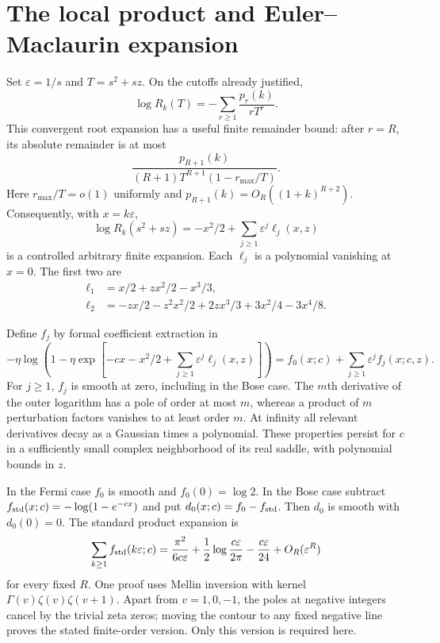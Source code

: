 \documentclass[11pt]{article}
\theoremstyle{remark}\newtheorem{remark}[theorem]{Remark}
\newcommand{\eps}{\varepsilon}
\begin{document}
\section{The local product and Euler--Maclaurin expansion}\label{aop:sec:EM}

Set $\eps=1/s$ and $T=s^2+sz$. On the cutoffs already justified,
\begin{equation}\label{aop:eq:rootseries}
 \log R_k(T)=-\sum_{r\ge1}\frac{p_r(k)}{rT^r}.
\end{equation}
This convergent root expansion has a useful finite remainder bound:
after $r=R$, its absolute remainder is at most
\begin{equation}\label{aop:eq:rooterror}
 \frac{p_{R+1}(k)}{(R+1)T^{R+1}(1-r_{\max}/T)}.
\end{equation}
Here $r_{\max}/T=o(1)$ uniformly and
$p_{R+1}(k)=O_R((1+k)^{R+2})$. Consequently, with $x=k\eps$,
\[
 \log R_k(s^2+sz)=-x^2/2+\sum_{j\ge1}\eps^j\ell_j(x,z)
\]
is a controlled arbitrary finite expansion. Each $\ell_j$ is a
polynomial vanishing at $x=0$. The first two are
\begin{align}
 \ell_1&=x/2+zx^2/2-x^3/3,\label{aop:eq:ell1}\\
 \ell_2&=-zx/2-z^2x^2/2+2zx^3/3+3x^2/4-3x^4/8.
 \label{aop:eq:ell2}
\end{align}

Define $f_j$ by formal coefficient extraction in
\begin{equation}\label{aop:eq:fj}
 -\eta\log\left(1-\eta\exp\left[-cx-x^2/2+
                  \sum_{j\ge1}\eps^j\ell_j(x,z)\right]\right)
 =f_0(x;c)+\sum_{j\ge1}\eps^jf_j(x;c,z).
\end{equation}
For $j\ge1$, $f_j$ is smooth at zero, including in the Bose case.
The $m$th derivative of the outer logarithm has a pole of order at most
$m$, whereas a product of $m$ perturbation factors vanishes to at least
order $m$. At infinity all relevant derivatives decay as a Gaussian
times a polynomial. These properties persist for $c$ in a sufficiently
small complex neighborhood of its real saddle, with polynomial bounds
in $z$.

In the Fermi case $f_0$ is smooth and $f_0(0)=\log2$. In the Bose case
subtract $f_{\rm std}(x;c)=-\log(1-e^{-cx})$ and put
$d_0(x;c)=f_0-f_{\rm std}$. Then $d_0$ is smooth with $d_0(0)=0$.
The standard product expansion is
\begin{equation}\label{aop:eq:eta}
 \sum_{k\ge1}f_{\rm std}(k\eps;c)
 =\frac{\pi^2}{6c\eps}+\frac12\log\frac{c\eps}{2\pi}
       -\frac{c\eps}{24}+O_R(\eps^R)
\end{equation}
for every fixed $R$. One proof uses Mellin inversion with kernel
$\Gamma(v)\zeta(v)\zeta(v+1)$. Apart from $v=1,0,-1$, the poles at
negative integers cancel by the trivial zeta zeros; moving the contour
to any fixed negative line proves the stated finite-order version.
Only this version is required here.
\end{document}
